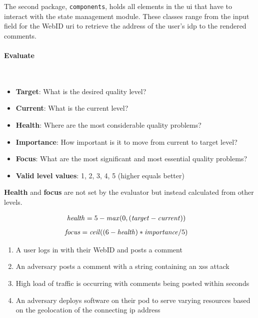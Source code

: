 The second package, \texttt{components}, holds all elements in the \gls{ui} that have to interact with the state management module. These classes range from the input field for the WebID \gls{uri} to retrieve the address of the user's \gls{idp} to the rendered comments.
\vspace{0.5cm}
\paragraph{Evaluate}\mbox{}\\

\begin{itemize}
    \item \textbf{Target}: What is the desired quality level?
    \item \textbf{Current}: What is the current level?
    \item \textbf{Health}: Where are the most considerable quality problems?
    \item \textbf{Importance}: How important is it to move from current to target level?
    \item \textbf{Focus}: What are the most significant and most essential quality problems?
    \item \textbf{Valid level values}: 1, 2, 3, 4, 5 (higher equals better)
\end{itemize}

\textbf{Health} and \textbf{focus} are not set by the evaluator but instead calculated from other levels.

\begin{align*}
    \text{\textit{health}}&=5 - \text{\textit{max}}(0, (\text{\textit{target}} - \text{\textit{current}}))
\end{align*}
\vspace{-5mm}
\begin{align*}
    \text{\textit{focus}}&= \text{\textit{ceil}}((6 - \text{\textit{health}}) * \text{\textit{importance}}/5)
\end{align*}

\begin{enumerate}
    \item A user logs in with their WebID and posts a comment
    \item An adversary posts a comment with a string containing an \gls{xss} attack
    \item High load of traffic is occurring with comments being posted within seconds
    \item An adversary deploys software on their pod to serve varying resources based on the geolocation of the connecting \gls{ip} address
\end{enumerate}

